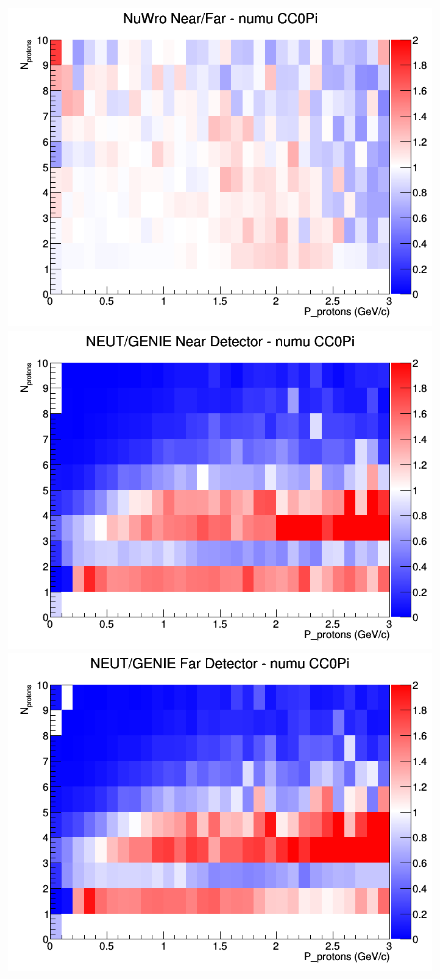 \begin{figure}[h]
\endminipage
{}
\includegraphics[width=\linewidth]{N_P/nominal/protons/ratios/CC0Pi_NuWro_numu_NF_N_P.png}
\endminipage
\newline
{}
\includegraphics[width=\linewidth]{N_P/nominal/protons/ratios/CC0Pi_NEUT_GENIE_numu_near_N_P.png}
\endminipage
{}
\includegraphics[width=\linewidth]{N_P/nominal/protons/ratios/CC0Pi_NEUT_GENIE_numu_far_N_P.png}

\end{figure}
